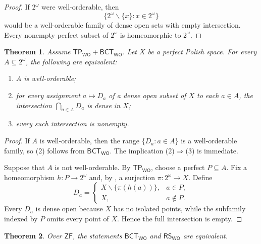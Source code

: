 \documentclass[11pt,reqno]{amsart}
\newcommand{\WO}{\mathsf{WO}}
\newcommand{\BCTWO}{\mathsf{BCT}_{\WO}}
\newcommand{\RSWO}{\mathsf{RS}_{\WO}}
\newcommand{\TP}{\mathsf{TP}_{\WO}}
\theoremstyle{plain}
\newtheorem{theorem}{Theorem}[section]
\theoremstyle{definition}
\theoremstyle{remark}
\begin{document}
\begin{proof}
If $2^\omega$ were well-orderable, then
\[
 \{2^\omega\smallsetminus\{x\}:x\in2^\omega\}
\]
would be a well-orderable family of dense open sets with empty intersection.
Every nonempty perfect subset of $2^\omega$ is homeomorphic to $2^\omega$.
\end{proof}

\begin{theorem}\label{thm:indexed-baire}
Assume $\TP+\BCTWO$.  Let $X$ be a perfect Polish space.  For every $A\subseteq2^\omega$, the following are equivalent:
\begin{enumerate}
\item $A$ is well-orderable;
\item for every assignment $a\mapsto D_a$ of a dense open subset of $X$ to
each $a\in A$, the intersection $\bigcap_{a\in A}D_a$ is dense in $X$;
\item every such intersection is nonempty.
\end{enumerate}
\end{theorem}

\begin{proof}
If $A$ is well-orderable, then the range $\{D_a:a\in A\}$ is a
well-orderable family, so (2) follows from $\BCTWO$.  The implication
(2)$\Rightarrow$(3) is immediate.

Suppose that $A$ is not well-orderable.  By $\TP$, choose a perfect
$P\subseteq A$.  Fix a homeomorphism $h:P\to2^\omega$ and, by
, a surjection $\pi:2^\omega\to X$.  Define
\[
 D_a=
 \begin{cases}
 X\smallsetminus\{\pi(h(a))\},&a\in P,\\
 X,&a\notin P.
 \end{cases}
\]
Every $D_a$ is dense open because $X$ has no isolated points, while the
subfamily indexed by $P$ omits every point of $X$.  Hence the full
intersection is empty.
\end{proof}

\begin{theorem}\label{thm:bct-rs}
Over $\mathsf{ZF}$, the statements $\BCTWO$ and $\RSWO$ are equivalent.
\end{theorem}
\end{document}
